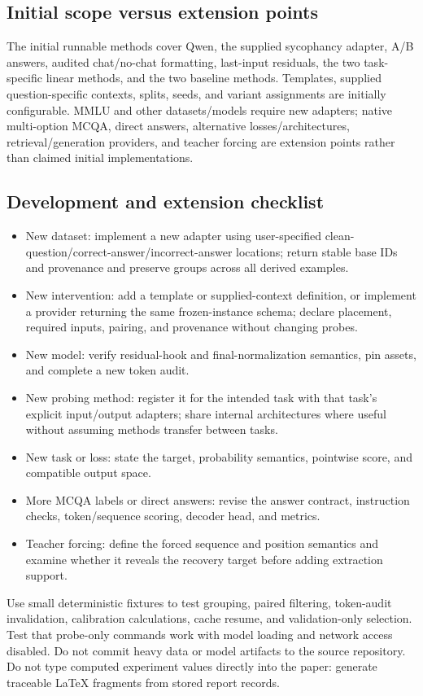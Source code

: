\documentclass[11pt]{article}
\begin{document}
\subsection*{Initial scope versus extension points}

The initial runnable methods cover Qwen, the supplied sycophancy adapter, A/B answers, audited chat/no-chat formatting, last-input residuals, the two task-specific linear methods, and the two baseline methods.
Templates, supplied question-specific contexts, splits, seeds, and variant assignments are initially configurable.
MMLU and other datasets/models require new adapters; native multi-option MCQA, direct answers, alternative losses/architectures, retrieval/generation providers, and teacher forcing are extension points rather than claimed initial implementations.

\subsection*{Development and extension checklist}

\begin{itemize}
\item New dataset: implement a new adapter using user-specified clean-question/correct-answer/incorrect-answer locations; return stable base IDs and provenance and preserve groups across all derived examples.
\item New intervention: add a template or supplied-context definition, or implement a provider returning the same frozen-instance schema; declare placement, required inputs, pairing, and provenance without changing probes.
\item New model: verify residual-hook and final-normalization semantics, pin assets, and complete a new token audit.
\item New probing method: register it for the intended task with that task's explicit input/output adapters; share internal architectures where useful without assuming methods transfer between tasks.
\item New task or loss: state the target, probability semantics, pointwise score, and compatible output space.
\item More MCQA labels or direct answers: revise the answer contract, instruction checks, token/sequence scoring, decoder head, and metrics.
\item Teacher forcing: define the forced sequence and position semantics and examine whether it reveals the recovery target before adding extraction support.
\end{itemize}
Use small deterministic fixtures to test grouping, paired filtering, token-audit invalidation, calibration calculations, cache resume, and validation-only selection.
Test that probe-only commands work with model loading and network access disabled.
Do not commit heavy data or model artifacts to the source repository.
Do not type computed experiment values directly into the paper: generate traceable LaTeX fragments from stored report records.
\end{document}
